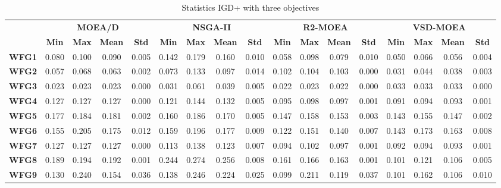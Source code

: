 \begin{table*}[t]
\caption{Statistics IGD+ with three objectives}
\label{tab:StatisticsIGDP_3obj}
\begin{tabular}{c|c|c|c|c|c|c|c|c|c|c|c|c|c|c|c|c|}
\cline{2-17}
 & \multicolumn{4}{c|}{\textbf{MOEA/D}} & \multicolumn{4}{c|}{\textbf{NSGA-II}} & \multicolumn{4}{c|}{\textbf{R2-MOEA}} & \multicolumn{4}{c|}{\textbf{VSD-MOEA}} \\ \cline{2-17} 
 & \textbf{Min} & \textbf{Max} & \textbf{Mean} & \textbf{Std} & \textbf{Min} & \textbf{Max} & \textbf{Mean} & \textbf{Std} & \textbf{Min} & \textbf{Max} & \textbf{Mean} & \textbf{Std} & \textbf{Min} & \textbf{Max} & \textbf{Mean} & \textbf{Std} \\ \hline
\multicolumn{1}{|c|}{\textbf{WFG1}} & 0.080 & 0.100 & 0.090 & 0.005 & 0.142 & 0.179 & 0.160 & 0.010 & 0.058 & 0.098 & 0.079 & 0.010 & 0.050 & 0.066 & 0.056 & 0.004 \\ \hline
\multicolumn{1}{|c|}{\textbf{WFG2}} & 0.057 & 0.068 & 0.063 & 0.002 & 0.073 & 0.133 & 0.097 & 0.014 & 0.102 & 0.104 & 0.103 & 0.000 & 0.031 & 0.044 & 0.038 & 0.003 \\ \hline
\multicolumn{1}{|c|}{\textbf{WFG3}} & 0.023 & 0.023 & 0.023 & 0.000 & 0.031 & 0.061 & 0.039 & 0.005 & 0.022 & 0.023 & 0.022 & 0.000 & 0.033 & 0.033 & 0.033 & 0.000 \\ \hline
\multicolumn{1}{|c|}{\textbf{WFG4}} & 0.127 & 0.127 & 0.127 & 0.000 & 0.121 & 0.144 & 0.132 & 0.005 & 0.095 & 0.098 & 0.097 & 0.001 & 0.091 & 0.094 & 0.093 & 0.001 \\ \hline
\multicolumn{1}{|c|}{\textbf{WFG5}} & 0.177 & 0.184 & 0.181 & 0.002 & 0.160 & 0.186 & 0.170 & 0.005 & 0.147 & 0.158 & 0.153 & 0.003 & 0.143 & 0.155 & 0.147 & 0.002 \\ \hline
\multicolumn{1}{|c|}{\textbf{WFG6}} & 0.155 & 0.205 & 0.175 & 0.012 & 0.159 & 0.196 & 0.177 & 0.009 & 0.122 & 0.151 & 0.140 & 0.007 & 0.143 & 0.173 & 0.163 & 0.008 \\ \hline
\multicolumn{1}{|c|}{\textbf{WFG7}} & 0.127 & 0.127 & 0.127 & 0.000 & 0.113 & 0.138 & 0.123 & 0.007 & 0.094 & 0.102 & 0.097 & 0.001 & 0.092 & 0.094 & 0.093 & 0.001 \\ \hline
\multicolumn{1}{|c|}{\textbf{WFG8}} & 0.189 & 0.194 & 0.192 & 0.001 & 0.244 & 0.274 & 0.256 & 0.008 & 0.161 & 0.166 & 0.163 & 0.001 & 0.101 & 0.121 & 0.106 & 0.005 \\ \hline
\multicolumn{1}{|c|}{\textbf{WFG9}} & 0.130 & 0.240 & 0.154 & 0.036 & 0.138 & 0.246 & 0.224 & 0.025 & 0.099 & 0.211 & 0.119 & 0.037 & 0.101 & 0.162 & 0.106 & 0.010 \\ \hline

\end{tabular}
\end{table*}
